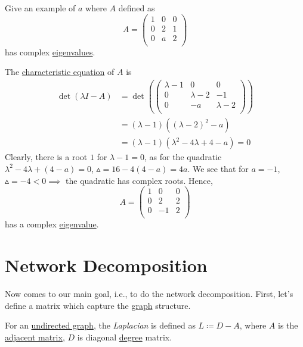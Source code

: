 \begin{eg}
	Give an example of \(a\) where \(A\) defined as
	\[
		A = \begin{pmatrix}
			1 & 0 & 0 \\
			0 & 2 & 1 \\
			0 & a & 2 \\
		\end{pmatrix}
	\]
	has complex \hyperref[def:eigenvalue]{eigenvalues}.
\end{eg}
\begin{explanation}
	The \hyperref[note:characteristic-equation]{characteristic equation} of \(A\) is
	\[
		\begin{split}
			\det(\lambda I - A) &= \det \left(  \begin{pmatrix}
				\lambda - 1 & 0            & 0             \\
				0           & \lambda -  2 & -1            \\
				0           & -a           & \lambda -   2 \\
			\end{pmatrix}\right)\\
			&= (\lambda - 1)((\lambda - 2 )^2 - a)\\
			&= (\lambda - 1)(\lambda^2 - 4\lambda + 4 - a) = 0
		\end{split}
	\]
	Clearly, there is a root \(1\) for \(\lambda - 1 = 0\), as for the quadratic \(\lambda^2 - 4\lambda + (4 - a) = 0\), \(\vartriangle = 16 - 4(4-a) = 4a\). We see that for \(a = -1\), \(\vartriangle = -4 < 0 \implies\) the quadratic has complex roots. Hence,
	\[
		A = \begin{pmatrix}
			1 & 0  & 0 \\
			0 & 2  & 2 \\
			0 & -1 & 2 \\
		\end{pmatrix}
	\]
	has a complex \hyperref[def:eigenvalue]{eigenvalue}.
\end{explanation}

\section{Network Decomposition}\label{sec:network-decomposition}
Now comes to our main goal, i.e., to do the network decomposition. First, let's define a matrix which capture the \hyperref[def:graph]{graph} structure.
\begin{definition}[Laplacian]\label{def:Laplacian}
	For an \hyperref[def:undirected-graph]{undirected graph}, the \emph{Laplacian} is defined as \(L \coloneqq D - A\), where \(A\) is the \hyperref[def:adjacency-matrix]{adjacent matrix}, \(D\) is diagonal \hyperref[def:degree]{degree} matrix.
\end{definition}

